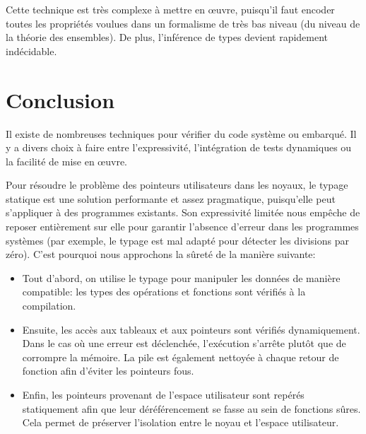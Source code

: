 Cette technique est très complexe à mettre en œuvre, puisqu'il faut encoder
toutes les propriétés voulues dans un formalisme de très bas niveau (du niveau
de la théorie des ensembles). De plus, l'inférence de types devient rapidement
indécidable.

\section*{Conclusion}

Il existe de nombreuses techniques pour vérifier du code système ou embarqué. Il
y a divers choix à faire entre l'expressivité, l'intégration de tests
dynamiques ou la facilité de mise en œuvre.

Pour résoudre le problème des pointeurs utilisateurs dans les noyaux, le typage
statique est une solution performante et assez pragmatique, puisqu'elle peut
s'appliquer à des programmes existants. Son expressivité limitée nous empêche de
reposer entièrement sur elle pour garantir l'absence d'erreur dans les
programmes systèmes (par exemple, le typage est mal adapté pour détecter les
divisions par zéro). C'est pourquoi nous approchons la sûreté de la manière
suivante:

\begin{itemize}
\item Tout d'abord, on utilise le typage pour manipuler les données de manière
      compatible: les types des opérations et fonctions sont vérifiés à la
      compilation.

\item Ensuite, les accès aux tableaux et aux pointeurs sont vérifiés
      dynamiquement. Dans le cas où une erreur est déclenchée, l'exécution
      s'arrête plutôt que de corrompre la mémoire. La pile est également
      nettoyée à chaque retour de fonction afin d'éviter les pointeurs fous.

\item Enfin, les pointeurs provenant de l'espace utilisateur sont repérés
      statiquement afin que leur déréférencement se fasse au sein de fonctions
      sûres. Cela permet de préserver l'isolation entre le noyau et l'espace
      utilisateur.
\end{itemize}


